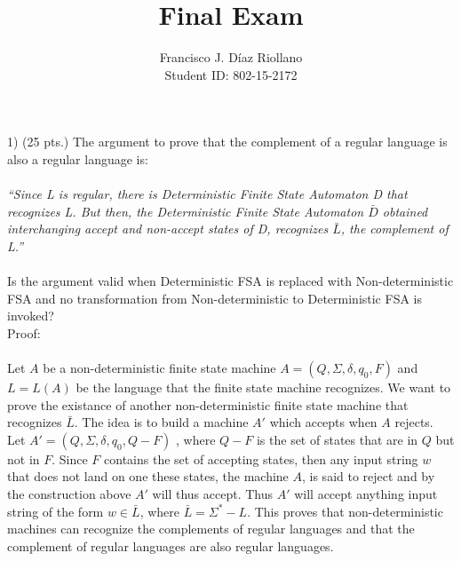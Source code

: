 \documentclass{report}
\title{Final Exam}
\author{Francisco J. Díaz Riollano \\ Student ID: 802-15-2172 }
\begin{document}
\maketitle
1) (25 pts.) The argument to prove that the complement of a regular language is also a regular language is: \\ \\
\textit{“Since L is regular, there is Deterministic Finite State Automaton D that recognizes L. But then, the Deterministic Finite State Automaton $\bar{D}$ obtained interchanging accept and non-accept states of D, recognizes $\bar{L} $, the complement of L.”}  \\ \\ Is the argument valid when Deterministic FSA is replaced with Non-deterministic FSA and no transformation from Non-deterministic to Deterministic FSA is invoked?\\[0.2in] 



Proof: \\ \\ 

Let $A$ be a non-deterministic finite state machine $A = (Q, \Sigma, \delta, q_0, F)$  and $L = L(A)$ be the language that the finite state machine recognizes. We want to prove the existance of another non-deterministic finite state machine that recognizes $\bar L$. The idea is to build a machine $A'$ which accepts when $A$ rejects. Let $A' = (Q,\Sigma, \delta,q_0, Q-F)$ , where $Q-F$ is the set of states that are in $Q$ but not in $F$. Since $F$ contains the set of accepting states, then any input string $w$ that does not land on one these states, the machine $A$, is said to reject and by the construction above $A'$ will thus accept. Thus $A'$ will accept anything input string of the form $w \in \bar L$, where  $\bar L = \Sigma^*- L$. This proves that non-deterministic machines can recognize the complements of regular languages and that the complement of regular languages are also regular languages.    \\ \\
\end{document}

